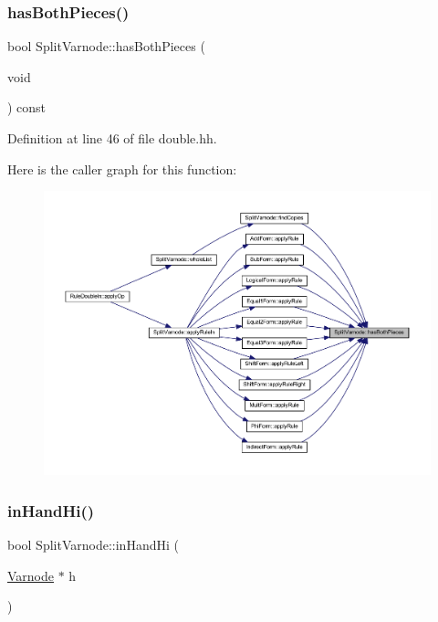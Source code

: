 \subsubsection{\texorpdfstring{hasBothPieces()}{hasBothPieces()}}
{\footnotesize\ttfamily bool Split\+Varnode\+::has\+Both\+Pieces (\begin{DoxyParamCaption}\item[{void}]{ }\end{DoxyParamCaption}) const\hspace{0.3cm}{\ttfamily [inline]}}



Definition at line 46 of file double.\+hh.

Here is the caller graph for this function\+:
\nopagebreak
\begin{figure}[H]
\begin{center}
\leavevmode
\includegraphics[width=350pt]{class_split_varnode_a6ac0b1ddf23347d284482e0bb02b00de_icgraph}
\end{center}
\end{figure}
\mbox{\label{class_split_varnode_aeabc6a2a9163112cf04c79aa2dfe31f8}} 
\subsubsection{\texorpdfstring{inHandHi()}{inHandHi()}}
{\footnotesize\ttfamily bool Split\+Varnode\+::in\+Hand\+Hi (\begin{DoxyParamCaption}\item[{\mbox{\hyperlink{class_varnode}{Varnode}} $\ast$}]{h }\end{DoxyParamCaption})}



